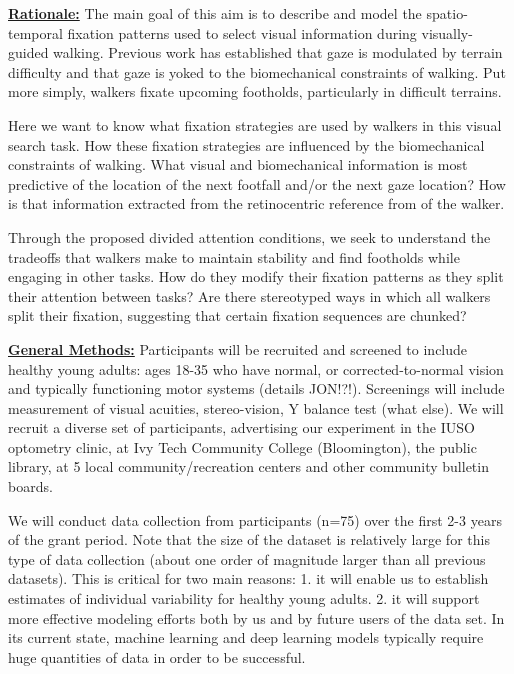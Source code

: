 

\textbf{\underline{Rationale:}} The main goal of this aim is to describe and model the spatio-temporal fixation patterns used to select visual information during visually-guided walking.  Previous work has established that gaze is modulated by terrain difficulty and that gaze is yoked to the biomechanical constraints of walking.  Put more simply, walkers fixate upcoming footholds, particularly in difficult terrains. 

Here we want to know what fixation strategies are used by walkers in this visual search task.  How these fixation strategies are influenced by the biomechanical constraints of walking. What visual and biomechanical information is most predictive of the location of the next footfall and/or the next gaze location?  How is that information extracted from the retinocentric reference from of the walker. 

Through the proposed divided attention conditions, we seek to understand the tradeoffs that walkers make to maintain stability and find footholds while engaging in other tasks.  How do they modify their fixation patterns as they split their attention between tasks?  Are there stereotyped ways in which all walkers split their fixation, suggesting that certain fixation sequences are chunked?

\noindent\textbf{\underline{General Methods:}} Participants will be recruited and screened to include healthy young adults: ages 18-35 who have normal, or corrected-to-normal vision and typically functioning motor systems (details JON!?!). Screenings will include measurement of visual acuities, stereo-vision, Y balance test (what else). We will recruit a diverse set of participants, advertising our experiment in the IUSO optometry clinic, at Ivy Tech Community College (Bloomington), the public library, at 5 local community/recreation centers and other community bulletin boards.

We will conduct data collection from participants (n=75) over the first 2-3 years of the grant period. Note that the size of the dataset is relatively large for this type of data collection (about one order of magnitude larger than all previous datasets).  This is critical for two main reasons: 1. it will enable us to establish estimates of individual variability for healthy young adults.  2. it will support more effective modeling efforts both by us and by future users of the data set.  In its current state, machine learning and deep learning models typically require huge quantities of data in order to be successful.

